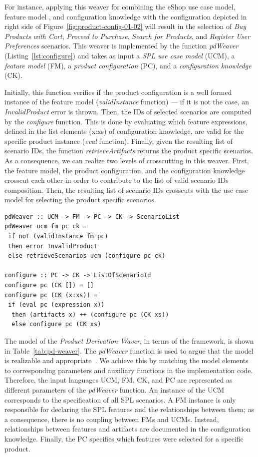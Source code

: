 \documentclass[11pt]{report}
\begin{document}
For instance, applying this weaver for combining the eShop use case model, feature model , and configuration knowledge with the configuration depicted in right side of Figure~\ref{fig:product-config-01-02} will result in the selection of  \emph{Buy Products with Cart}, \emph{Proceed to Purchase}, \emph{Search for Products}, and \emph{Register User Preferences} scenarios.  
 This weaver is implemented by the function \emph{pdWeaver} (Listing~\ref{lst:configure}) and takes as input 
a \emph{SPL use case model} (UCM), a \emph{feature model} (FM), a \emph{product configuration} (PC), and a \emph{configuration knowledge} (CK). 

Initially, this function verifies if the product configuration is a well formed instance of the feature model (\emph{validInstance} function) --- if it is not the case,  an \emph{InvalidProduct} error is thrown. Then, the IDs of selected scenarios are computed by the \emph{configure} function. This is done by evaluating which feature expressions, defined in the list elements (x:xs) of configuration knowledge, are valid for the specific product instance (\emph{eval} function). Finally, given the resulting list of scenario IDs, the function \emph{retrieveArtifacts} returns the product specific scenarios. 
As a consequence, we can realize two levels of crosscutting in this weaver. First, the feature model, the product configuration, and the configuration knowledge crosscut each other in order to contribute to the list of valid scenario IDs composition. Then, the resulting list of scenario IDs crosscuts with the use case model for selecting the product specific scenarios.    

\begin{lstlisting}[belowskip=20pt,frame=tb,caption={Product derivation weaver function},label=lst:configure]
pdWeaver :: UCM -> FM -> PC -> CK -> ScenarioList
pdWeaver ucm fm pc ck = 
 if not (validInstance fm pc) 
 then error InvalidProduct
 else retrieveScenarios ucm (configure pc ck)

configure :: PC -> CK -> ListOfScenarioId
configure pc (CK []) = []
configure pc (CK (x:xs)) =
 if (eval pc (expression x))
  then (artifacts x) ++ (configure pc (CK xs))
  else configure pc (CK xs)
\end{lstlisting}

The model of the \emph{Product Derivation Waver}, 
in terms of the framework, is shown in Table~\ref{tab:pd-weaver}. The \emph{pdWeaver} function is used to argue that the model is realizable and appropriate~\cite{kiczales-ecoop-2003}. We achieve this by matching the model elements 
to corresponding parameters and auxiliary functions in the implementation code. Therefore, the input languages UCM, FM, CK, and PC are represented as different parameters 
of the \emph{pdWeaver} function. An instance of the UCM corresponds to the specification of all 
SPL scenarios. A FM instance is only responsible for declaring the SPL features and the relationships between 
them; as a consequence, there is no coupling between FMs and UCMs. Instead, relationships between features and artifacts are documented in the configuration knowledge. Finally, the PC specifies which features were selected 
for a specific product. 
\end{document}

